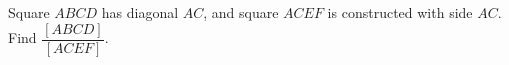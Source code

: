 Square $ ABCD $ has diagonal $ AC $, and square $ ACEF $ is constructed with side $ AC $. Find $\dfrac{[ABCD]}{[ACEF]}$.
